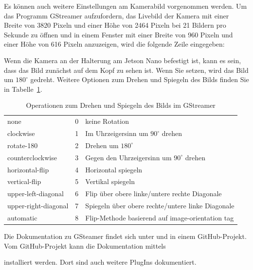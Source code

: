 \medskip

Es können auch weitere Einstellungen am Kamerabild vorgenommen werden. Um das Programm GStreamer aufzufordern, das Livebild der Kamera mit einer Breite von 3820 Pixeln und einer Höhe von 2464 Pixeln bei 21 Bildern pro Sekunde zu öffnen und in einem Fenster mit einer Breite von 960 Pixeln und einer Höhe von 616 Pixeln anzuzeigen, wird die folgende Zeile eingegeben:

\medskip




    

Wenn die Kamera an der Halterung am Jetson Nano befestigt ist, kann es sein, dass das Bild zunächst auf dem Kopf zu sehen ist. Wenn Sie  setzen, wird das Bild um $180^\circ$ gedreht. Weitere Optionen zum Drehen und Spiegeln des Bilds finden Sie in Tabelle~\ref{Flip}.

\medskip

\medskip
\begin{table} [H]
    \centering
    \begin{tabular} {l c l}
        none& 0 & keine Rotation \\
        clockwise& 1 & Im Uhrzeigersinn um $90^\circ$ drehen \\
        rotate-180& 2 &  Drehen um $180^\circ$ \\
        counterclockwise& 3 & Gegen den Uhrzeigersinn um $90^\circ$ drehen \\
        horizontal-flip& 4 & Horizontal spiegeln \\
        vertical-flip& 5 & Vertikal spiegeln \\
        upper-left-diagonal& 6 & Flip über obere linke/untere rechte Diagonale \\
        upper-right-diagonal& 7 & Spiegeln über obere rechte/untere linke Diagonale\\
        automatic& 8 & Flip-Methode basierend auf image-orientation tag\\
    \end{tabular}
    \caption{Operationen zum Drehen und Spiegeln des Bilds im GStreamer}
    \label{Flip}
\end{table}


\medskip


Die Dokumentation zu GSteamer findet sich unter \Cite{GStreamer:2021} und in einem GitHub-Projekt. Vom GitHub-Projekt kann die Dokumentation mittels

\medskip


\medskip

installiert werden. Dort sind auch weitere PlugIns dokumentiert.
